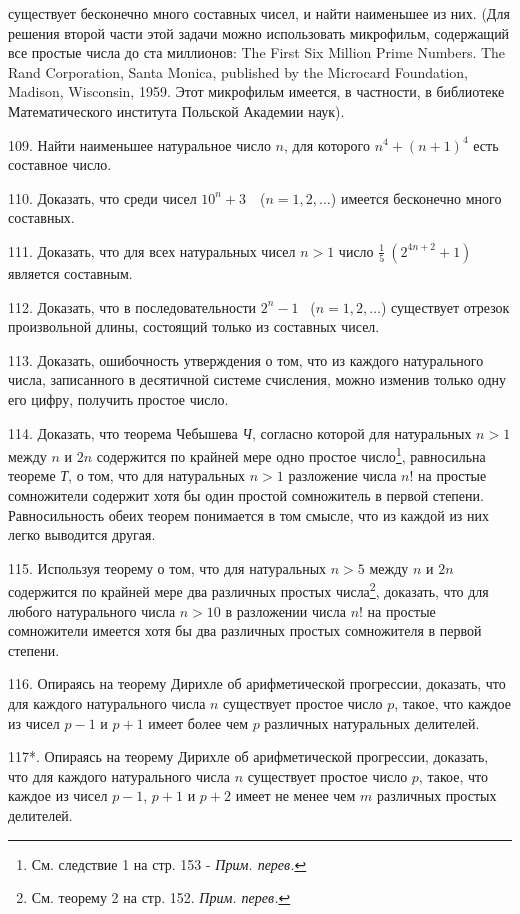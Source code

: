 \documentclass[12pt, a4paper, openany]{book}
\begin{document}
существует бесконечно много составных чисел, и найти наименьшее из них. (Для решения второй части этой задачи можно использовать микрофильм, содержащий все простые числа до ста миллионов: The First Six Million Prime Numbers. The Rand Corporation, Santa Monica, published by the Microcard Foundation, Madison, Wisconsin, 1959. Этот микрофильм имеется, в частности, в библиотеке Математического института Польской Академии наук).

109. Найти наименьшее натуральное число $n$, для которого $n^4+(n+1)^4$ есть составное число.

110. Доказать, что среди чисел $10^n+3$\ \ ($n=1,2,\dots$) имеется бесконечно много составных.

111. Доказать, что для всех натуральных чисел $n>1$ число $\displaystyle\frac{1}{5}\ (2^{4n+2}+1)$ является составным.

112. Доказать, что в последовательности $2^n-1$ \ ($n=1,2, \dots$) существует отрезок произвольной длины, состоящий только из составных чисел.

113. Доказать, ошибочность утверждения о том, что из каждого натурального числа, записанного в десятичной системе счисления, можно изменив только одну его цифру, получить простое число.

114. Доказать, что теорема Чебышева \textit{Ч}, согласно которой для натуральных $n>1$ между $n$ и $2n$ содержится по крайней мере одно простое число\footnote{См. следствие 1 на стр. 153 - \textit{Прим. перев.}}, равносильна теореме \textit{Т}, о том, что для натуральных $n>1$  разложение числа $n!$ на простые сомножители содержит хотя бы один простой сомножитель в первой степени. Равносильность обеих теорем понимается в том смысле, что из каждой из них легко выводится другая.

115. Используя теорему о том, что для натуральных $n>5$ между $n$ и $2n$ содержится по крайней мере два различных простых числа\footnote{См. теорему 2 на стр. 152. \textit{Прим. перев.}}, доказать, что для любого натурального числа $n>10$ в разложении числа $n!$ на простые сомножители имеется хотя бы два различных простых сомножителя в первой степени.

116. Опираясь на теорему Дирихле об арифметической прогрессии, доказать, что для каждого натурального числа $n$ существует простое число $p$, такое, что каждое из чисел $p-1$ и $p+1$ имеет более чем $p$ различных натуральных делителей.

117*. Опираясь на теорему Дирихле об арифметической прогрессии, доказать, что для каждого натурального числа $n$ существует простое число $p$, такое, что каждое из чисел $p-1$, $p+1$ и $p+2$ имеет не менее чем $m$ различных простых делителей.
\end{document}
